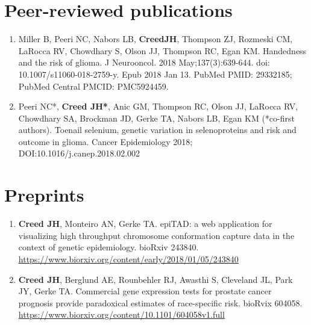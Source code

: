 \documentclass[11pt, a4paper]{article} %
\newcommand{\years}[1]{\marginnote{\scriptsize \raise .3ex\hbox{#1}}} %
\begin{document}

\section*{Peer-reviewed publications}
\begin{enumerate}[leftmargin=*]

\item{} Miller B, Peeri NC, Nabors LB, {\bf CreedJH}, Thompson ZJ, Rozmeski CM, LaRocca RV, Chowdhary S, Olson JJ, Thompson RC, Egan KM. Handedness and the risk of glioma. J
Neurooncol. 2018 May;137(3):639-644. doi: 10.1007/s11060-018-2759-y. Epub 2018
Jan 13. PubMed PMID: 29332185; PubMed Central PMCID: PMC5924459.

\item{} Peeri NC*, {\bf Creed JH*}, Anic GM, Thompson RC, Olson JJ, LaRocca RV, Chowdhary SA, Brockman JD, Gerke TA, Nabors LB, Egan KM (*co-first authors). Toenail selenium, genetic variation in selenoproteins and risk and outcome in glioma. Cancer Epidemiology 2018; DOI:10.1016/j.canep.2018.02.002

\end{enumerate}

\section*{Preprints}
\begin{enumerate}[leftmargin=*]

\item{} {\bf Creed JH}, Monteiro AN, Gerke TA. epiTAD: a web application for visualizing high throughput chromosome conformation capture data in the context of genetic epidemiology. bioRxiv 243840. \href{https://www.biorxiv.org/content/early/2018/01/05/243840}{https://www.biorxiv.org/content/early/2018/01/05/243840}

\item{} {\bf Creed JH}, Berglund AE, Rounbehler RJ, Awasthi S, Cleveland JL, Park JY, Gerke TA. Commercial gene expression tests for prostate cancer prognosis provide  paradoxical estimates of race-specific risk. bioRvix 604058. \href{https://www.biorxiv.org/content/10.1101/604058v1.full}{https://www.biorxiv.org/content/10.1101/604058v1.full}
\end{enumerate}
\end{document}
